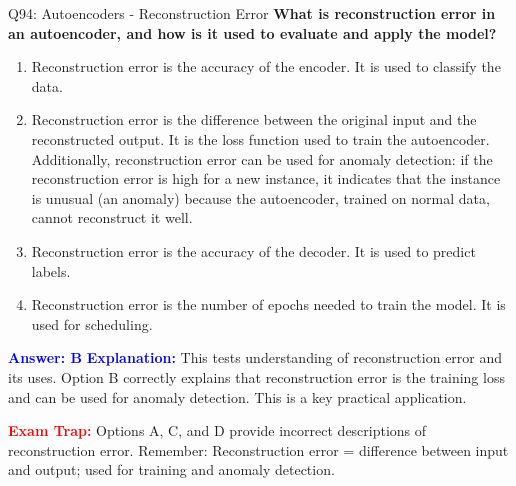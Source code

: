 \documentclass[8pt]{beamer}
\begin{document}
	\begin{frame}{Q94: Autoencoders - Reconstruction Error}
		\fontsize{6.5}{7.5}\selectfont
		\textbf{What is reconstruction error in an autoencoder, and how is it used to evaluate and apply the model?}
		
		\begin{enumerate}
			\item Reconstruction error is the accuracy of the encoder. It is used to classify the data.
			\item Reconstruction error is the difference between the original input and the reconstructed output. It is the loss function used to train the autoencoder. Additionally, reconstruction error can be used for anomaly detection: if the reconstruction error is high for a new instance, it indicates that the instance is unusual (an anomaly) because the autoencoder, trained on normal data, cannot reconstruct it well.
			\item Reconstruction error is the accuracy of the decoder. It is used to predict labels.
			\item Reconstruction error is the number of epochs needed to train the model. It is used for scheduling.
		\end{enumerate}
		
		\vspace{0.1cm}
		\textcolor{blue}{\textbf{Answer: B}}
		\vspace{0.1cm}
		\textcolor{blue}{\textbf{Explanation:}} This tests understanding of reconstruction error and its uses. Option B correctly explains that reconstruction error is the training loss and can be used for anomaly detection. This is a key practical application.
		
		\textcolor{red}{\textbf{Exam Trap:}} Options A, C, and D provide incorrect descriptions of reconstruction error. Remember: Reconstruction error = difference between input and output; used for training and anomaly detection.
	\end{frame}
	
\end{document}
